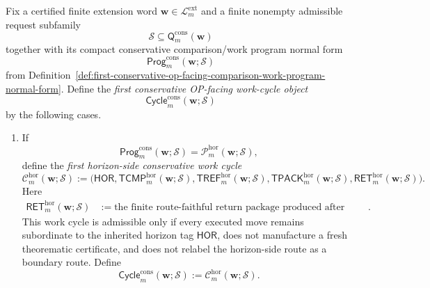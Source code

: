 \begin{definition}
\label{def:first-conservative-op-facing-program-to-execution-work-cycle-layer}
Fix a certified finite extension word \(\mathbf w\in\mathcal L^{\mathrm{ext}}_{m}\) and a finite nonempty admissible request subfamily
\[
  \mathcal S \subseteq \mathsf{Q}^{\mathrm{cons}}_{m}(\mathbf w)
\]
together with its compact conservative comparison/work program normal form
\[
  \mathsf{Prog}^{\mathrm{cons}}_{m}(\mathbf w;\mathcal S)
\]
from Definition~\ref{def:first-conservative-op-facing-comparison-work-program-normal-form}. Define the \emph{first conservative OP-facing work-cycle object}
\[
  \mathsf{Cycle}^{\mathrm{cons}}_{m}(\mathbf w;\mathcal S)
\]
by the following cases.
\begin{enumerate}[label=(\roman*)]
  \item If
  \[
    \mathsf{Prog}^{\mathrm{cons}}_{m}(\mathbf w;\mathcal S)
    =
    \mathcal P^{\mathrm{hor}}_{m}(\mathbf w;\mathcal S),
  \]
define the \emph{first horizon-side conservative work cycle}
\[
  \mathcal C^{\mathrm{hor}}_{m}(\mathbf w;\mathcal S)
  :=
  \bigl(
    \mathsf{HOR},
    \mathsf{TCMP}^{\mathrm{hor}}_{m}(\mathbf w;\mathcal S),
    \mathsf{TREF}^{\mathrm{hor}}_{m}(\mathbf w;\mathcal S),
    \mathsf{TPACK}^{\mathrm{hor}}_{m}(\mathbf w;\mathcal S),
    \mathsf{RET}^{\mathrm{hor}}_{m}(\mathbf w;\mathcal S)
  \bigr).
\]
Here
\begin{align*}
  \mathsf{RET}^{\mathrm{hor}}_{m}(\mathbf w;\mathcal S)
  &:= \text{the finite route-faithful return package produced after executing the admitted horizon-side comparison/refinement/packaging cycle}.
\end{align*}
This work cycle is admissible only if every executed move remains subordinate to the inherited horizon tag \(\mathsf{HOR}\), does not manufacture a fresh theorematic certificate, and does not relabel the horizon-side route as a boundary route. Define
\[
  \mathsf{Cycle}^{\mathrm{cons}}_{m}(\mathbf w;\mathcal S)
  :=
  \mathcal C^{\mathrm{hor}}_{m}(\mathbf w;\mathcal S).
\]


\end{enumerate}
\end{definition}
